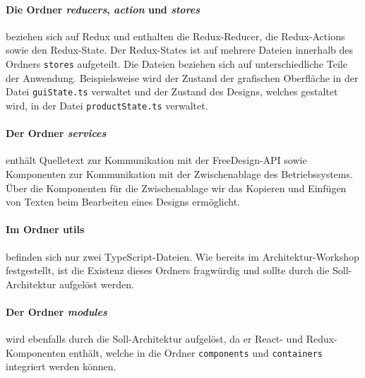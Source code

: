 \paragraph{Die Ordner \emph{reducers}, \emph{action} und \emph{stores}} beziehen sich auf Redux und enthalten die Redux-Reducer, die Redux-Actions sowie den Redux-State. Der Redux-States ist auf mehrere Dateien innerhalb des Ordners \lstinline|stores| aufgeteilt. Die Dateien beziehen sich auf unterschiedliche Teile der Anwendung. Beispielsweise wird der Zustand der grafischen Oberfläche in der Datei \lstinline|guiState.ts| verwaltet und der Zustand des Designs, welches gestaltet wird, in der Datei \lstinline|productState.ts| verwaltet. 

\paragraph{Der Ordner \emph{services}} enthält Quelletext zur Kommunikation mit der FreeDesign-API sowie Komponenten zur Kommunikation mit der Zwischenablage des Betriebssystems. Über die Komponenten für die Zwischenablage wir das Kopieren und Einfügen von Texten beim Bearbeiten eines Designs ermöglicht.


\paragraph{Im Ordner utils} befinden sich nur zwei TypeScript-Dateien. Wie bereits im Architektur-Workshop festgestellt, ist die Existenz dieses Ordners fragwürdig und sollte durch die Soll-Architektur aufgelöst werden.  

\paragraph{Der Ordner \emph{modules}} wird ebenfalls durch die Soll-Architektur aufgelöst, da er React- und Redux-Komponenten enthält, welche in die Ordner \lstinline|components| und \lstinline|containers| integriert werden können.


